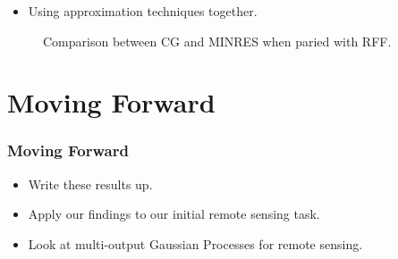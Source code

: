 \documentclass[9pt,hyperref={pdfpagelabels=false},xcolor=table]{beamer}
\begin{document}
\begin{frame}
    \begin{itemize}
        \item Using approximation techniques together.
    \end{itemize}
    \begin{figure}
        \centering
        \caption{Comparison between CG and MINRES when paried with RFF.}
    \end{figure}
\end{frame}

\section{Moving Forward}

\begin{frame}
    \frametitle{Moving Forward}
    \begin{itemize}
        \item Write these results up.
        \item Apply our findings to our initial remote sensing task.
        \item Look at multi-output Gaussian Processes for remote sensing.
    \end{itemize}
\end{frame}
\end{document}
